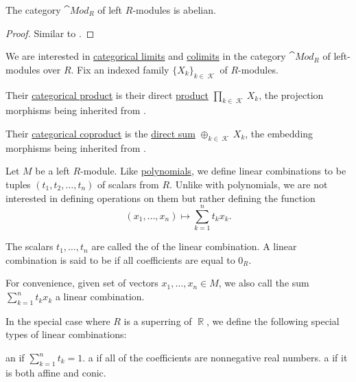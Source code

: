 \begin{proposition}\label{thm:mod_r_is_abelian}
  The category \( \cat{Mod}_R \) of left \( R \)-modules is abelian.
\end{proposition}
\begin{proof}
  Similar to .
\end{proof}

\begin{proposition}\label{thm:module_categorical_limits}
  We are interested in \hyperref[def:categorical_limit]{categorical limits} and \hyperref[def:categorical_colimit]{colimits} in the category \( \cat{Mod}_R \) of left-modules over \( R \). Fix an indexed family  \( \{ X_k \}_{k \in \mscrK} \) of \( R \)-modules.
  \begin{defenum}
     Their \hyperref[def:categorical_product]{categorical product} is their direct \hyperref[def:left_module_direct_product]{product} \( \prod_{k \in \mscrK} X_k \), the projection morphisms being inherited from .

     Their \hyperref[def:categorical_coproduct]{categorical coproduct} is the \hyperref[def:group_direct_product]{direct sum} \( \oplus_{k \in \mscrK} X_k \), the embedding morphisms being inherited from .
  \end{defenum}
\end{proposition}

\begin{definition}\label{def:linear_combination}
  Let \( M \) be a left \( R \)-module. Like \hyperref[def:polynomial]{polynomials}, we define linear combinations to be tuples \( (t_1, t_2, \ldots, t_n) \) of scalars from \( R \). Unlike with polynomials, we are not interested in defining operations on them but rather defining the function
  \begin{equation}\label{def:linear_combination/function}
    (x_1, \ldots, x_n) \mapsto \sum_{k=1}^n t_k x_k.
  \end{equation}

  The scalars \( t_1, \ldots, t_n \) are called the  of the linear combination. A linear combination is said to be  if all coefficients are equal to \( 0_R \).

  For convenience, given set of vectors \( x_1, \ldots, x_n \in M \), we also call the sum \( \sum_{k=1}^n t_k x_k \) a linear combination.

  In the special case where \( R \) is a superring of \( \BbbR \), we define the following special types of linear combinations:
  \begin{defenum}
     an  if \( \sum_{k=1}^n t_k = 1 \).
     a  if all of the coefficients are nonnegative real numbers.
     a  if it is both affine and conic.
  \end{defenum}
\end{definition}

